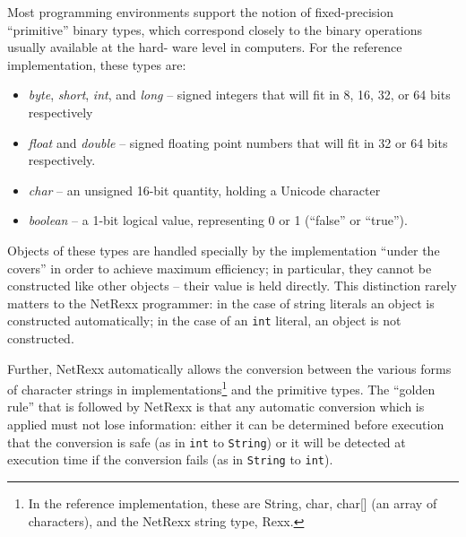 Most programming environments support the notion of fixed-precision
“primitive” binary types, which correspond closely to the binary
operations usually available at the hard- ware level in computers. For
the reference implementation, these types are:
\begin{itemize}
\item \emph{byte}, \emph{short}, \emph{int}, and \emph{long} – signed integers that will fit in 8, 16, 32, or 64 bits respectively
\item \emph{float} and \emph{double} – signed floating point numbers that will fit in 32 or 64 bits respectively.
\item \emph{char} – an unsigned 16-bit quantity, holding a Unicode character
\item \emph{boolean} – a 1-bit logical value, representing 0 or 1
    (“false” or “true”).
\end{itemize}
Objects of these types are handled specially by the implementation “under the covers” in order to achieve maximum efficiency; in particular, they cannot be constructed like other objects – their value is held directly. This distinction rarely matters to the NetRexx programmer: in the case of string literals an object is constructed automatically; in the case of an \texttt{int} literal, an object is not constructed.

Further, NetRexx automatically allows the conversion between the
various forms of character strings in implementations\footnote{In the
  reference implementation, these are String, char, char[] (an array
  of characters), and the NetRexx string type, Rexx.} and the
primitive types. The “golden rule” that is followed by NetRexx is that
any automatic conversion which is applied must not lose information:
either it can be determined before execution that the conversion is
safe (as in \texttt{int} to \texttt{String}) or it will be detected at
execution time if the conversion fails (as in \texttt{String} to
\texttt {int}).

